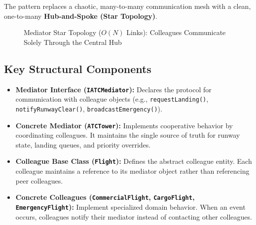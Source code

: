 \documentclass[12pt,a4paper]{article}
\begin{document}
The pattern replaces a chaotic, many-to-many communication mesh with a clean, one-to-many \textbf{Hub-and-Spoke (Star Topology)}.

\begin{figure}[htbp]
\centering
{}
\caption{Mediator Star Topology ($O(N)$ Links): Colleagues Communicate Solely Through the Central Hub}
\label{fig:star_topology}
\end{figure}

\subsection{Key Structural Components}
\begin{itemize}
    \item \textbf{Mediator Interface (\texttt{IATCMediator}):} Declares the protocol for communication with colleague objects (e.g., \texttt{requestLanding()}, \texttt{notifyRunwayClear()}, \texttt{broadcastEmergency()}).
    \item \textbf{Concrete Mediator (\texttt{ATCTower}):} Implements cooperative behavior by coordinating colleagues. It maintains the single source of truth for runway state, landing queues, and priority overrides.
    \item \textbf{Colleague Base Class (\texttt{Flight}):} Defines the abstract colleague entity. Each colleague maintains a reference to its mediator object rather than referencing peer colleagues.
    \item \textbf{Concrete Colleagues (\texttt{CommercialFlight}, \texttt{CargoFlight}, \texttt{EmergencyFlight}):} Implement specialized domain behavior. When an event occurs, colleagues notify their mediator instead of contacting other colleagues.
\end{itemize}
\end{document}
